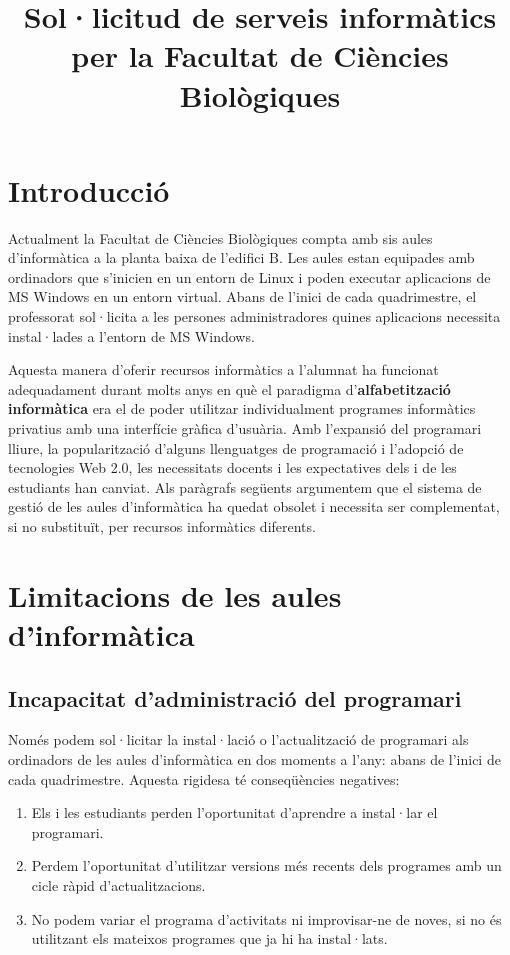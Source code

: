 \documentclass[a4paper,12pt]{article}
\title{Sol·licitud de serveis informàtics per la Facultat de Ciències Biològiques}
\begin{document}
\maketitle
\section{Introducció}
Actualment la Facultat de Ciències Biològiques compta amb sis aules d'informàtica
a la planta baixa de l'edifici B. Les aules estan equipades amb ordinadors que
s'inicien en un entorn de Linux i poden executar aplicacions de MS Windows en un
entorn virtual. Abans de l'inici de cada quadrimestre, el professorat sol·licita
a les persones administradores quines aplicacions necessita instal·lades a l'entorn
de MS Windows.

Aquesta manera d'oferir recursos informàtics a l'alumnat ha funcionat adequadament
durant molts anys en què el paradigma d'\textbf{alfabetització informàtica} era el
de poder utilitzar individualment programes informàtics privatius amb una interfície
gràfica d'usuària. Amb l'expansió del programari lliure, la popularització d'alguns
llenguatges de programació i l'adopció de tecnologies Web 2.0, les necessitats docents
i les expectatives dels i de les estudiants han canviat. Als paràgrafs següents
argumentem que el sistema de gestió de les aules d'informàtica ha quedat obsolet i
necessita ser complementat, si no substituït, per recursos informàtics diferents.

\section{Limitacions de les aules d'informàtica}
\subsection{Incapacitat d'administració del programari}
Només podem sol·licitar la instal·lació o l'actualització
de programari als ordinadors de les aules d'informàtica en dos moments a l'any: abans de
l'inici de cada quadrimestre. Aquesta rigidesa té conseqüències negatives:

\begin{enumerate}
\item Els i les estudiants perden l'oportunitat d'aprendre a instal·lar el programari.
\item Perdem l'oportunitat d'utilitzar versions més recents dels programes amb un cicle
ràpid d'actualitzacions.
\item No podem variar el programa d'activitats ni improvisar-ne de noves, si no és
utilitzant els mateixos programes que ja hi ha instal·lats.
\end{enumerate}
\end{document}
